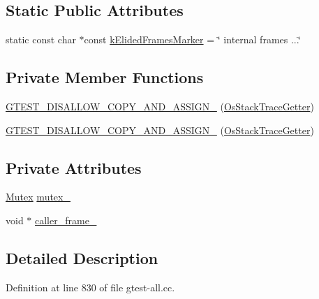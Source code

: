 \subsection*{\-Static \-Public \-Attributes}
\begin{DoxyCompactItemize}
\item 
static const char $\ast$const \hyperlink{classtesting_1_1internal_1_1OsStackTraceGetter_adf15738d11421bb96e42bd0baa4ab1cd}{k\-Elided\-Frames\-Marker} = \char`\"{} internal frames ...\char`\"{}
\end{DoxyCompactItemize}
\subsection*{\-Private \-Member \-Functions}
\begin{DoxyCompactItemize}
\item 
\hyperlink{classtesting_1_1internal_1_1OsStackTraceGetter_a763aac5392b86e245cba0766e2db06f8}{\-G\-T\-E\-S\-T\-\_\-\-D\-I\-S\-A\-L\-L\-O\-W\-\_\-\-C\-O\-P\-Y\-\_\-\-A\-N\-D\-\_\-\-A\-S\-S\-I\-G\-N\-\_\-} (\hyperlink{classtesting_1_1internal_1_1OsStackTraceGetter}{\-Os\-Stack\-Trace\-Getter})
\item 
\hyperlink{classtesting_1_1internal_1_1OsStackTraceGetter_a763aac5392b86e245cba0766e2db06f8}{\-G\-T\-E\-S\-T\-\_\-\-D\-I\-S\-A\-L\-L\-O\-W\-\_\-\-C\-O\-P\-Y\-\_\-\-A\-N\-D\-\_\-\-A\-S\-S\-I\-G\-N\-\_\-} (\hyperlink{classtesting_1_1internal_1_1OsStackTraceGetter}{\-Os\-Stack\-Trace\-Getter})
\end{DoxyCompactItemize}
\subsection*{\-Private \-Attributes}
\begin{DoxyCompactItemize}
\item 
\hyperlink{classtesting_1_1internal_1_1Mutex}{\-Mutex} \hyperlink{classtesting_1_1internal_1_1OsStackTraceGetter_a01268d7e44c318a733a4c6c4d08deb04}{mutex\-\_\-}
\item 
void $\ast$ \hyperlink{classtesting_1_1internal_1_1OsStackTraceGetter_aaecddfab7cd60af213d15b75cc88df14}{caller\-\_\-frame\-\_\-}
\end{DoxyCompactItemize}


\subsection{\-Detailed \-Description}


\-Definition at line 830 of file gtest-\/all.\-cc.



